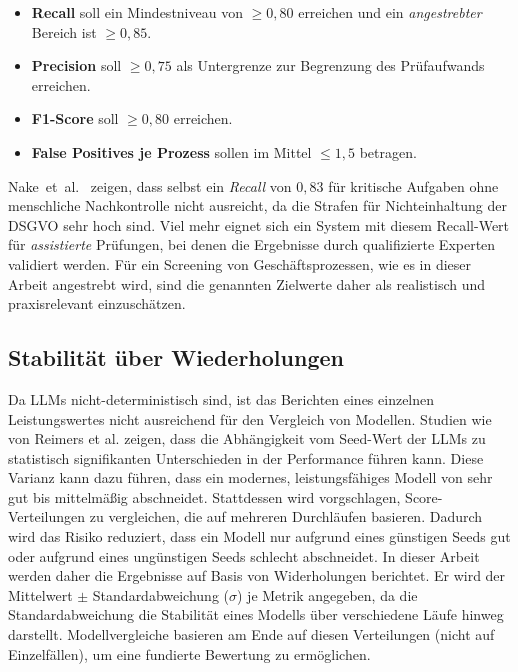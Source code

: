 \begin{itemize}
    \item \textbf{Recall} soll ein Mindestniveau von $\geq 0{,}80$ erreichen und ein \emph{angestrebter} Bereich ist $\geq 0{,}85$.
    \item \textbf{Precision} soll $\geq 0{,}75$ als Untergrenze zur Begrenzung des Prüfaufwands erreichen.
    \item \textbf{F1-Score} soll $\geq 0{,}80$  erreichen.
    \item \textbf{False Positives je Prozess} sollen im Mittel $\leq 1{,}5$ betragen.
\end{itemize}

Nake~et~al.\ \cite{nake2023towards} zeigen, dass selbst ein \emph{Recall} von $0{,}83$ für kritische Aufgaben ohne menschliche Nachkontrolle nicht ausreicht, da die Strafen für Nichteinhaltung der \ac{DSGVO} sehr hoch sind. Viel mehr eignet sich ein System mit diesem Recall-Wert für \emph{assistierte} Prüfungen, bei denen die Ergebnisse durch qualifizierte Experten validiert werden. Für ein Screening von Geschäftsprozessen, wie es in dieser Arbeit angestrebt wird, sind die genannten Zielwerte daher als realistisch und praxisrelevant einzuschätzen.

\subsection*{Stabilität über Wiederholungen}

Da \acp{LLM} nicht-deterministisch sind, ist das Berichten eines einzelnen Leistungswertes nicht ausreichend für den Vergleich von Modellen. Studien wie von Reimers et al. \cite{reimers2017reporting} zeigen, dass die Abhängigkeit vom Seed-Wert der \acp{LLM} zu statistisch signifikanten Unterschieden in der Performance führen kann. Diese Varianz kann dazu führen, dass ein modernes, leistungsfähiges Modell von sehr gut bis mittelmäßig abschneidet. Stattdessen wird vorgschlagen, Score-Verteilungen zu vergleichen, die auf mehreren Durchläufen basieren. Dadurch wird das Risiko reduziert, dass ein Modell nur aufgrund eines günstigen Seeds gut oder aufgrund eines ungünstigen Seeds schlecht abschneidet. In dieser Arbeit werden daher die Ergebnisse auf Basis von Widerholungen berichtet. Er wird der Mittelwert $\pm$ Standardabweichung ($\sigma$) je Metrik angegeben, da die Standardabweichung die Stabilität eines Modells über verschiedene Läufe hinweg darstellt. Modellvergleiche basieren am Ende auf diesen Verteilungen (nicht auf Einzelfällen), um eine fundierte Bewertung zu ermöglichen.